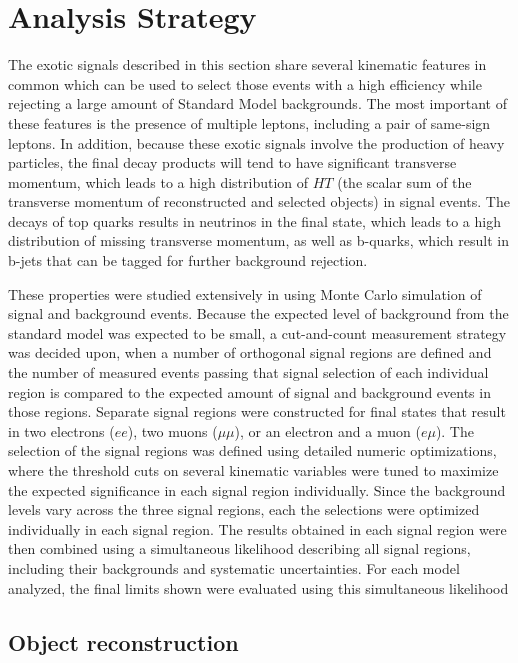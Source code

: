 \section{Analysis Strategy}\label{sect:strategy}

The exotic signals described in this section share several kinematic features in common which can be used to select those events with a high efficiency while rejecting a large amount of Standard Model backgrounds.
The most important of these features is the presence of multiple leptons, including a pair of same-sign leptons.
In addition, because these exotic signals involve the production of heavy particles, the final decay products will tend to have significant transverse momentum, which leads to a high distribution of $HT$ (the scalar sum of the transverse momentum of reconstructed and selected objects) in signal events.
The decays of top quarks results in neutrinos in the final state, which leads to a high distribution of missing transverse momentum, as well as b-quarks, which result in b-jets that can be tagged for further background rejection.

These properties were studied extensively in using Monte Carlo simulation of signal and background events.
Because the expected level of background from the standard model was expected to be small, a cut-and-count measurement strategy was decided upon, when a number of orthogonal signal regions are defined and the number of measured events passing that signal selection of each individual region is compared to the expected amount of signal and background events in those regions.
Separate signal regions were constructed for final states that result in two electrons ($ee$), two muons ($\mu \mu$), or an electron and a muon ($e \mu$).
The selection of the signal regions was defined using detailed numeric optimizations, where the threshold cuts on several kinematic variables were tuned to maximize the expected significance in each signal region individually.
Since the background levels vary across the three signal regions, each the selections were optimized individually in each signal region.
The results obtained in each signal region were then combined using a simultaneous likelihood describing all signal regions, including their backgrounds and systematic uncertainties.
For each model analyzed, the final limits shown were evaluated using this simultaneous likelihood


\subsection{Object reconstruction}\label{sect:objects}

